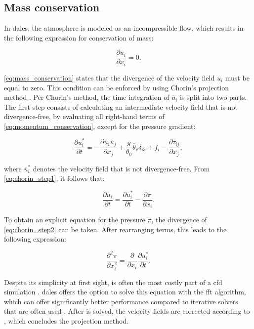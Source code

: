 \subsection{Mass conservation} \label{sec:dales_poisson}
In \acrshort{dales}, the atmosphere is modeled as an incompressible flow, which results in the following expression for conservation of mass:

\begin{equation}
    \frac{\partial \overline{u}_i}{\partial x_i} = 0. \label{eq:mass_conservation}
\end{equation}

\autoref{eq:mass_conservation} states that the divergence of the velocity field $u_i$ must be equal to zero. This condition can be enforced by using Chorin's projection method \citep{chorinNumericalSolutionNavierStokes1967}. Per Chorin's method, the time integration of $\overline{u}_i$ is split into two parts. The first step consists of calculating an intermediate velocity field that is not divergence-free, by evaluating all right-hand terms of \autoref{eq:momentum_conservation}, except for the pressure gradient:

\begin{equation}
    \frac{\partial \overline{u}^*_i}{\partial t} = - \frac{\partial \overline{u}_i \overline{u}_j}{\partial x_j} + \frac{g}{\theta_0}\overline{\theta}_v \delta_{i3} + f_i - \frac{\partial \tau_{ij}}{\partial x_j}, \label{eq:chorin_step1}
\end{equation}

where $\overline{u}^*_i$ denotes the velocity field that is not divergence-free. From \autoref{eq:chorin_step1}, it follows that:

\begin{equation}
    \frac{\partial \overline{u}_i}{\partial t} = \frac{\partial \overline{u}^*_i}{\partial t} - \frac{\partial \pi}{\partial x_i}. \label{eq:chorin_step2}
\end{equation}

To obtain an explicit equation for the pressure $\pi$, the divergence of \autoref{eq:chorin_step2} can be taken. After rearranging terms, this leads to the following expression:

\begin{equation}
    \frac{\partial^2 \pi}{\partial x_i^2} = \frac{\partial}{\partial x_i} \frac{\partial \overline{u}_i^*}{\partial t}. \label{eq:poisson_equation}
\end{equation}

Despite its simplicity at first sight,  is often the most costly part of a \acrshort{cfd} simulation \citep{costaFFTbasedFinitedifferenceSolver2018}. \acrshort{dales} offers the option to solve this equation with the \acrfull{fft} algorithm, which can offer significantly better performance compared to iterative solvers that are often used \citep{hockneyFastDirectSolution1965}. After  is solved, the velocity fields are corrected according to , which concludes the projection method.

